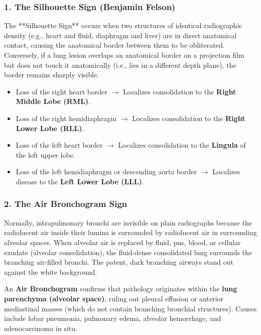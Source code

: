 \documentclass[11pt,a4paper]{article}
\begin{document}
\subsubsection{1. The Silhouette Sign (Benjamin Felson)}
The **Silhouette Sign** occurs when two structures of identical radiographic density (e.g., heart and fluid, diaphragm and liver) are in direct anatomical contact, causing the anatomical border between them to be obliterated. Conversely, if a lung lesion overlaps an anatomical border on a projection film but does not touch it anatomically (i.e., lies in a different depth plane), the border remains sharply visible.
\begin{itemize}
    \item Loss of the right heart border $\to$ Localizes consolidation to the \textbf{Right Middle Lobe (RML)}.
    \item Loss of the right hemidiaphragm $\to$ Localizes consolidation to the \textbf{Right Lower Lobe (RLL)}.
    \item Loss of the left heart border $\to$ Localizes consolidation to the \textbf{Lingula} of the left upper lobe.
    \item Loss of the left hemidiaphragm or descending aorta border $\to$ Localizes disease to the \textbf{Left Lower Lobe (LLL)}.
\end{itemize}

\subsubsection{2. The Air Bronchogram Sign}
Normally, intrapulmonary bronchi are invisible on plain radiographs because the radiolucent air inside their lumina is surrounded by radiolucent air in surrounding alveolar spaces. When alveolar air is replaced by fluid, pus, blood, or cellular exudate (alveolar consolidation), the fluid-dense consolidated lung surrounds the branching air-filled bronchi. The patent, dark branching airways stand out against the white background.
\begin{clinicalpearl}
An \textbf{Air Bronchogram} confirms that pathology originates within the \textbf{lung parenchyma (alveolar space)}, ruling out pleural effusion or anterior mediastinal masses (which do not contain branching bronchial structures). Causes include lobar pneumonia, pulmonary edema, alveolar hemorrhage, and adenocarcinoma in situ.
\end{clinicalpearl}
\end{document}
